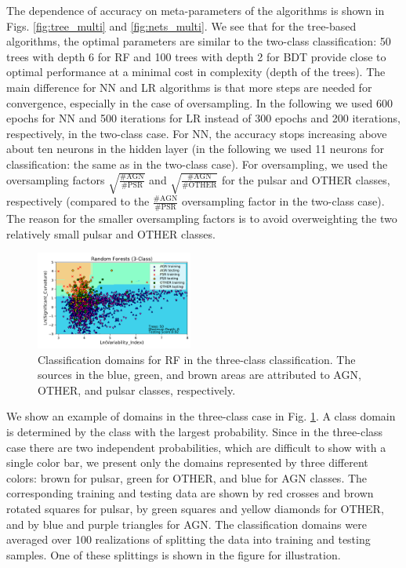 \documentclass[referee]{aa} %
\begin{document}
The dependence of accuracy on meta-parameters of the algorithms is shown in Figs. \ref{fig:tree_multi} and \ref{fig:nets_multi}.
We see that for the tree-based algorithms, the optimal parameters are similar to the two-class classification: 50 trees with depth 6 for RF and 100 trees with depth 2 for BDT 
provide close to optimal performance at a minimal cost in complexity (depth of the trees).
The main difference for NN and LR algorithms is that more steps are needed for convergence, especially in the case of oversampling. 
In the following we used 600 epochs for NN and 500 iterations for LR instead of 300 epochs and 200 iterations, respectively, in the two-class case.
For NN, the accuracy stops increasing above about ten neurons in the hidden layer (in the following we used 11 neurons for classification: the same as in the two-class case).
For oversampling, we used the oversampling factors $\sqrt{\frac{\text{\# AGN}}{\text{\# PSR}}}$ and $\sqrt{\frac{\text{\# AGN}}{\text{\# OTHER}}}$ for the pulsar and OTHER classes, respectively (compared to the $\frac{\text{\# AGN}}{\text{\# PSR}}$ oversampling factor in the two-class case).
The reason for the smaller oversampling factors is to avoid overweighting the two relatively small pulsar and OTHER classes.

\begin{figure}[h]
\centering
\includegraphics[width=0.46\textwidth]{plots/classification_domains/rf_50_6_3class.pdf}
\caption{Classification domains for RF in the three-class classification.
The sources in the blue, green, and brown areas are attributed to AGN, OTHER, and pulsar classes, respectively.
}
\label{fig:RF_domains_3class}
\end{figure}

We show an example of domains in the three-class case in Fig. \ref{fig:RF_domains_3class}.
A class domain is determined by the class with the largest probability.
Since in the three-class case there are two independent probabilities, which are difficult to show with a single color bar,
we present only the domains represented by three different colors: brown for pulsar, green for OTHER, and blue for AGN classes.
The corresponding training and testing data are shown by red crosses and brown rotated squares for pulsar, by green squares and yellow diamonds for OTHER,
and by blue and purple triangles for AGN.
The classification domains were averaged over 100 realizations of splitting the data into training and testing samples.
One of these splittings is shown in the figure for illustration.
\end{document}
